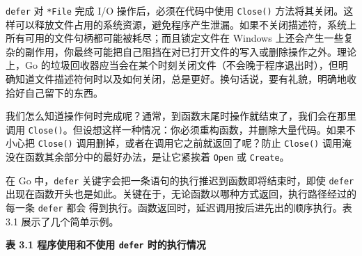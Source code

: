 \begin{infobox}{\texttt{defer}}
对 \texttt{*File} 完成 I/O 操作后，必须在代码中使用 \texttt{Close()} 方法将其关闭。这样可以释放文件占用的系统资源，避免程序产生泄漏。如果不关闭描述符，系统上所有可用的文件句柄都可能被耗尽；而且锁定文件在 Windows 上还会产生一些复杂的副作用，你最终可能把自己阻挡在对已打开文件的写入或删除操作之外。理论上，Go 的垃圾回收器应当会在某个时刻关闭文件（不会晚于程序退出时），但明确知道文件描述符何时以及如何关闭，总是更好。换句话说，要有礼貌，明确地收拾好自己留下的东西。

我们怎么知道操作何时完成呢？通常，到函数末尾时操作就结束了，我们会在那里调用 \texttt{Close()}。但设想这样一种情况：你必须重构函数，并删除大量代码。如果不小心把 \texttt{Close()} 调用删掉，或者在调用它之前就返回了呢？防止 \texttt{Close()} 调用淹没在函数其余部分中的最好办法，是让它紧挨着 \texttt{Open} 或 \texttt{Create}。

在 Go 中，\texttt{defer} 关键字会把一条语句的执行推迟到函数即将结束时，即使 \texttt{defer} 出现在函数开头也是如此。关键在于，无论函数以哪种方式返回，执行路径经过的每一条 \texttt{defer} 都会
得到执行。函数返回时，延迟调用按后进先出的顺序执行。表 3.1 展示了几个简单示例。
\end{infobox}

\textbf{表 3.1 程序使用和不使用 \texttt{defer} 时的执行情况}

